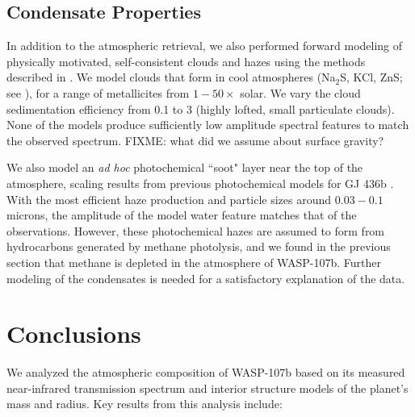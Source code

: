 \documentclass[twocolumn]{aastex61}
\begin{document}
\subsection{Condensate Properties}
In addition to the atmospheric retrieval, we also performed forward modeling of physically motivated, self-consistent clouds and hazes using the methods described in \cite{fortney08, morley15}.  We model clouds that form in cool atmospheres (Na$_2$S, KCl, ZnS; see \citealt{morley12}), for a range of metallicites from $1-50\times$ solar. We vary the cloud sedimentation efficiency from 0.1 to 3 (highly lofted, small particulate clouds). None of the models produce sufficiently low amplitude spectral features to match the observed spectrum. FIXME: what did we assume about surface gravity?

We also model an \emph{ad hoc} photochemical ``soot" layer near the top of the atmosphere, scaling results from previous photochemical models for GJ 436b \citep{line11, morley17}. With the most efficient haze production and particle sizes around $0.03-0.1$ microns, the amplitude of the model water feature matches that of the observations. However, these photochemical hazes are assumed to form from hydrocarbons generated by methane photolysis, and we found in the previous section that methane is depleted in the atmosphere of WASP-107b.  %
Further modeling of the condensates is needed for a satisfactory explanation of the data.

\section{Conclusions} \label{sec:discuss}
We analyzed the atmospheric composition of WASP-107b based on its measured near-infrared transmission spectrum and interior structure models of the planet's mass and radius.  Key results from this analysis include:
\end{document}

